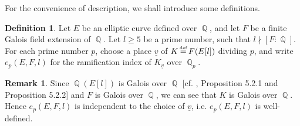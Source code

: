 \documentclass[a4paper, 12pt]{article}
\newcommand{\uv}{\underline{v}}
\DeclareMathOperator{\defeq}{\overset{\text{\tiny{def}}}{=}}
\DeclareMathOperator{\Q}{\mathbb{Q}}
\numberwithin{equation}{section}
\theoremstyle{definition}
\newtheorem{definition}[thm]{Definition}
\newtheorem{tiny-remark}{Remark}[thm]
\begin{document}
For the convenience of description, we shall introduce some definitions.

\begin{definition}  \label{1-2-def}
Let $E$ be an elliptic curve defined over $\Q$, and let $F$ be a finite Galois field extension of $\Q$.
Let $l\ge 5$ be a prime number, such that $l\nmid [F:\Q]$.
For each prime number $p$, choose a place $\uv$ of $K\defeq F(E[l])$ dividing $p$, and write $e_p(E,F,l)$ for the ramification index of $K_{\uv}$ over $\Q_p$. 
\end{definition}
\begin{tiny-remark}
Since $\Q(E[l])$ is Galois over $\Q$ [cf. \cite{TorsionPointFields}, Proposition 5.2.1 and Proposition 5.2.2] and $F$ is Galois over $\Q$, we can see that $K$ is Galois over $\Q$. Hence $e_p(E,F,l)$ is independent to the choice of $\uv$, i.e.  $e_p(E,F,l)$ is well-defined.
\end{tiny-remark}
\end{document}
